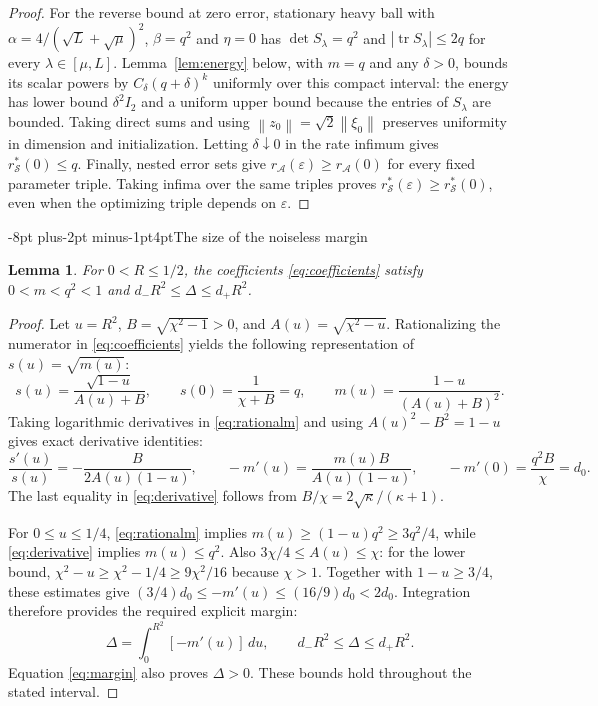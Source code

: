 \documentclass[pdflatex,sn-mathphys-num]{sn-jnl}
\makeatletter
\renewcommand\subsection{\@startsection{subsection}{2}{\z@}%
  {-8pt plus-2pt minus-1pt}{4pt}{\subsectionfont}}
\theoremstyle{thmstyleone}
\newtheorem{lemma}{Lemma}
\theoremstyle{thmstyletwo}
\newcommand{\tr}{\operatorname{tr}}
\newcommand{\norm}[1]{\left\lVert #1\right\rVert}
\makeatother
\begin{document}
\begin{proof}
For the reverse bound at zero error, stationary heavy ball with
$\alpha=4/(\sqrt L+\sqrt\mu)^2$, $\beta=q^2$ and $\eta=0$
has $\det S_\lambda=q^2$ and $|\tr S_\lambda|\leq2q$
for every $\lambda\in[\mu,L]$. Lemma~\ref{lem:energy} below,
with $m=q$ and any $\delta>0$, bounds its scalar powers by
$C_\delta(q+\delta)^k$ uniformly over this compact interval:
the energy has lower bound $\delta^2I_2$ and a uniform upper
bound because the entries of $S_\lambda$ are bounded.
Taking direct sums and using $\norm{z_0}=\sqrt2\norm{\xi_0}$
preserves uniformity in dimension and initialization. Letting
$\delta\downarrow0$ in the rate infimum gives
$r_{\mathcal S}^*(0)\leq q$. Finally, nested error sets give
$r_{\mathcal A}(\varepsilon)\geq r_{\mathcal A}(0)$ for every
fixed parameter triple. Taking infima over the same triples proves
$r_{\mathcal S}^*(\varepsilon)\geq r_{\mathcal S}^*(0)$, even
when the optimizing triple depends on $\varepsilon$.
\end{proof}

\subsection{The size of the noiseless margin}
\begin{lemma}\label{lem:margin}
For $0<R\leq1/2$, the coefficients \eqref{eq:coefficients} satisfy
$0<m<q^2<1$ and $d_-R^2\leq\Delta\leq d_+R^2$.
\end{lemma}
\begin{proof}
Let $u=R^2$, $B=\sqrt{\chi^2-1}>0$, and
$A(u)=\sqrt{\chi^2-u}$. Rationalizing the numerator in
\eqref{eq:coefficients} yields the following representation of
$s(u)=\sqrt{m(u)}$:
\begin{equation}\label{eq:rationalm}
 s(u)=\frac{\sqrt{1-u}}{A(u)+B},\qquad
 s(0)=\frac1{\chi+B}=q,\qquad
 m(u)=\frac{1-u}{(A(u)+B)^2}.
\end{equation}
Taking logarithmic derivatives in \eqref{eq:rationalm} and using
$A(u)^2-B^2=1-u$ gives exact derivative identities:
\begin{equation}\label{eq:derivative}
 \frac{s'(u)}{s(u)}=-\frac{B}{2A(u)(1-u)},\qquad
 -m'(u)=\frac{m(u)B}{A(u)(1-u)},\qquad
 -m'(0)=\frac{q^2B}{\chi}=d_0.
\end{equation}
The last equality in \eqref{eq:derivative} follows from
$B/\chi=2\sqrt\kappa/(\kappa+1)$.

For $0\leq u\leq1/4$, \eqref{eq:rationalm} implies
$m(u)\geq(1-u)q^2\geq3q^2/4$, while
\eqref{eq:derivative} implies $m(u)\leq q^2$.
Also $3\chi/4\leq A(u)\leq\chi$: for the lower bound,
$\chi^2-u\geq\chi^2-1/4\geq9\chi^2/16$ because $\chi>1$.
Together with $1-u\geq3/4$, these estimates give
$(3/4)d_0\leq -m'(u)\leq(16/9)d_0<2d_0$.
Integration therefore provides the required explicit margin:
\begin{equation}\label{eq:margin}
 \Delta=\int_0^{R^2}[-m'(u)]\,du,\qquad
 d_-R^2\leq\Delta\leq d_+R^2 .
\end{equation}
Equation \eqref{eq:margin} also proves $\Delta>0$. These bounds hold
throughout the stated interval.
\end{proof}
\end{document}
